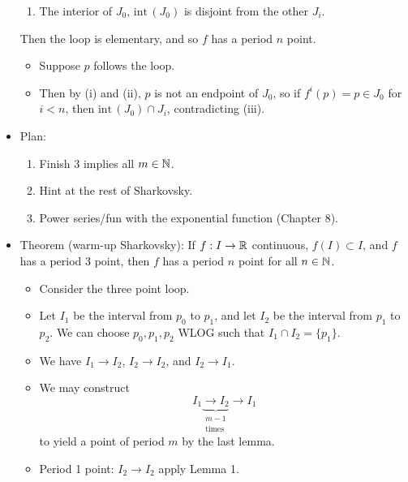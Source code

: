 \documentclass[../notes.tex]{subfiles}
\begin{document}
\begin{itemize}
\begin{enumerate}[label={(\roman*)}]
        \item The interior of $J_0$, $\text{int}\,(J_0)$ is disjoint from the other $J_i$.
    \end{enumerate}
    Then the loop is elementary, and so $f$ has a period $n$ point.
    \begin{itemize}
        \item Suppose $p$ follows the loop.
        \item Then by (i) and (ii), $p$ is not an endpoint of $J_0$, so if $f^i(p)=p\in J_0$ for $i<n$, then $\text{int}\,(J_0)\cap J_i$, contradicting (iii).
    \end{itemize}
    \item {}Plan:
    \begin{enumerate}
        \item Finish 3 implies all $m\in\mathbb{N}$.
        \item Hint at the rest of Sharkovsky.
        \item Power series/fun with the exponential function (Chapter 8).
    \end{enumerate}
    \item Theorem (warm-up Sharkovsky): If $f:I\to\mathbb{R}$ continuous, $f(I)\subset I$, and $f$ has a period 3 point, then $f$ has a period $n$ point for all $n\in\mathbb{N}$.
    \begin{itemize}
        \item Consider the three point loop.
        \item Let $I_1$ be the interval from $p_0$ to $p_1$, and let $I_2$ be the interval from $p_1$ to $p_2$. We can choose $p_0,p_1,p_2$ WLOG such that $I_1\cap I_2=\{p_1\}$.
        \item We have $I_1\to I_2$, $I_2\to I_2$, and $I_2\to I_1$.
        \item We may construct
        \begin{equation*}
            I_1 \underbrace{\to I_2}_{\substack{m-1\\\text{times}}} \to I_1
        \end{equation*}
        to yield a point of period $m$ by the last lemma.
        \item Period 1 point: $I_2\to I_2$ apply Lemma 1.
    \end{itemize}
\end{itemize}
\end{document}
